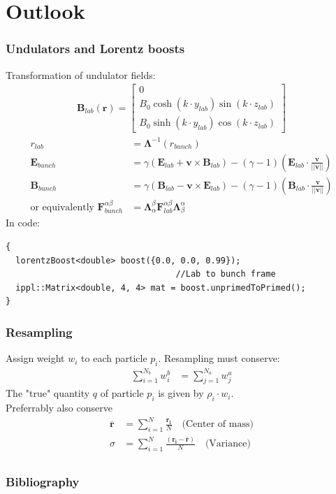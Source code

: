 \documentclass[5pt]{beamer}
\begin{document}
\section{Outlook}
\frame[noframenumbering]{\tableofcontents[currentsection]}
\begin{frame}[fragile]
\frametitle{Undulators and Lorentz boosts}
Transformation of undulator fields:
\begin{align*}
\mathbf{B}_{lab}(\mathbf{r}) = \begin{bmatrix} 0 \\ B_0 \cosh{(k \cdot y_{lab})} \sin{(k \cdot z_{lab})} \\ B_0 \sinh{(k \cdot y_{lab})} \cos{(k \cdot z_{lab})} \end{bmatrix}
\end{align*}
\pause
\begin{align*}
  r_{lab} &= \mathbf{\Lambda}^{-1}(r_{bunch}) \\
  \mathbf{E}_{bunch} &= \gamma(\mathbf{E}_{lab} + \mathbf{v} \times \mathbf{B}_{lab}) - (\gamma - 1)\left(\mathbf{E}_{lab} \cdot \frac{\mathbf{v}}{||\mathbf{v}||}\right) \\
  \mathbf{B}_{bunch} &= \gamma(\mathbf{B}_{lab} - \mathbf{v} \times \mathbf{E}_{lab}) - (\gamma - 1)\left(\mathbf{B}_{lab} \cdot \frac{\mathbf{v}}{||\mathbf{v}||}\right) \\
  \text{or equivalently  } \mathbf{F}^{\alpha\beta}_{bunch} &= \mathbf{\Lambda}^\beta_\alpha \mathbf{F}^{\alpha \beta}_{lab}\mathbf{\Lambda}_\beta^\alpha
\end{align*}
In code:
\begin{lstlisting}[style=CppStyle]
{
  lorentzBoost<double> boost({0.0, 0.0, 0.99});
                                  //Lab to bunch frame
  ippl::Matrix<double, 4, 4> mat = boost.unprimedToPrimed();
}
\end{lstlisting}
\end{frame}
\begin{frame}
\frametitle{Resampling}
Assign weight $w_i$ to each particle $p_i$.
\pause
Resampling must conserve:
\begin{align*}
  \sum _{i = 1} ^ {N_{b}} w^b_i &= \sum _{j = 1} ^ {N_{a}} w^a_j
\end{align*}
The "true" quantity $q$ of particle $p_i$ is given by $\rho_i \cdot w_i$. \\
\pause
\vspace{1cm}
Preferrably also conserve 
\begin{align*}
\overline {\mathbf{r}} &= \sum _{i = 1} ^ {N}\frac{\mathbf{r_i}}{N} \text{    } \text{    (Center of mass)} \\
\sigma &= \sum _{i = 1} ^ {N}\frac{(\mathbf{r_i} - \overline {\mathbf{r}})}{N} \text{    } \text{    (Variance)} \\
\end{align*}
\end{frame}
\begin{frame}
\frametitle{Bibliography}
%

\end{frame}
\end{document}
